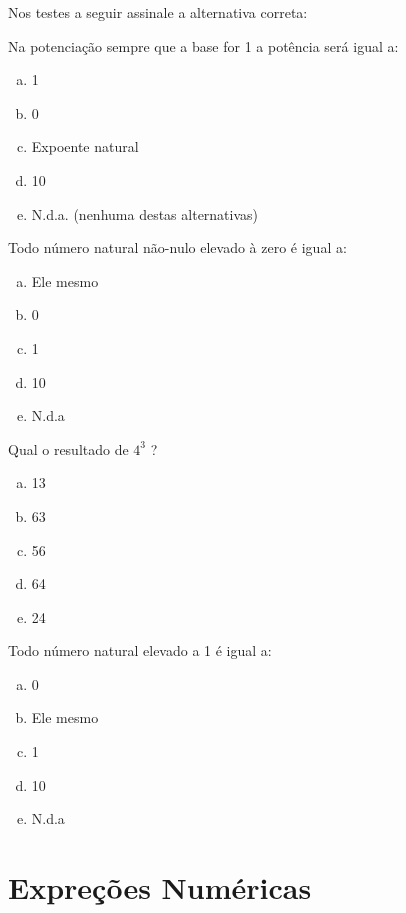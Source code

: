 Nos testes a seguir assinale a alternativa correta:
\item Na potenciação sempre que a base for 1 a potência será igual a:
\begin{enumerate}[a)]
	\item 1
	\item 0
	\item Expoente natural
	\item 10
	\item N.d.a. (nenhuma destas alternativas)
\end{enumerate}

\item Todo número natural não-nulo elevado à zero é igual a:
\begin{enumerate}[a)]
	\item Ele mesmo
	\item 0
	\item 1
	\item 10
	\item N.d.a
\end{enumerate}

\item Qual o resultado de $4^3$ ?
\begin{enumerate}[a)]
	\item 13
	\item 63
	\item 56
	\item 64
	\item 24
\end{enumerate}

\item Todo número natural elevado a 1 é igual a:
\begin{enumerate}[a)]
	\item 0
	\item Ele mesmo
	\item 1
	\item 10
	\item N.d.a
\end{enumerate}


\section{Expreções Numéricas}
